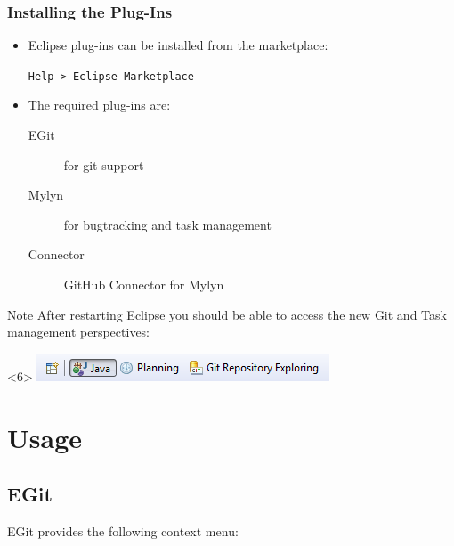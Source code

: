 \documentclass{beamer}
\begin{document}
\begin{frame}[<+->]
  \frametitle{Installing the Plug-Ins}
  \begin{itemize}
  \item Eclipse plug-ins can be installed from the marketplace:

    \texttt{Help > Eclipse Marketplace}
  \item The required plug-ins are:
    \begin{description}
    \item[EGit] for git support
    \item[Mylyn] for bugtracking and task management
    \item[Connector] GitHub Connector for Mylyn
    \end{description}
  \end{itemize}
  \begin{block}{Note}
    After restarting Eclipse you should be able to access the new Git and Task management perspectives:

  \begin{visibleenv}<6>
    \includegraphics{perspectives}
  \end{visibleenv}
  \end{block}
\end{frame}

\section{Usage}

\subsection{EGit}
\begin{frame}
EGit provides the following context menu:

\end{frame}
\end{document}
